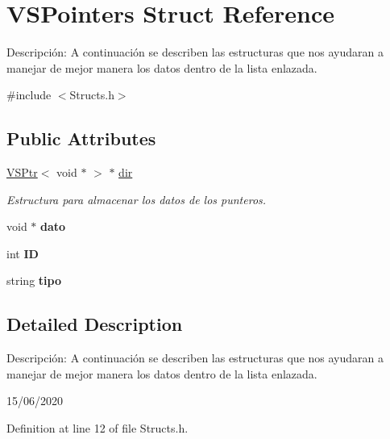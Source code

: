 \hypertarget{struct_v_s_pointers}{}\section{V\+S\+Pointers Struct Reference}
\label{struct_v_s_pointers}


Descripción\+: A continuación se describen las estructuras que nos ayudaran a manejar de mejor manera los datos dentro de la lista enlazada.  




{\ttfamily \#include $<$Structs.\+h$>$}

\subsection*{Public Attributes}
\begin{DoxyCompactItemize}
\item 
\hyperlink{class_v_s_ptr}{V\+S\+Ptr}$<$ void $\ast$ $>$ $\ast$ \hyperlink{struct_v_s_pointers_aea8397b023eff4e5652f02d17e4bd2b6}{dir}
\begin{DoxyCompactList}\small\item\em Estructura para almacenar los datos de los punteros. \end{DoxyCompactList}\item 
\mbox{\label{struct_v_s_pointers_ab7d83561dc6ec8c0d35cf006f675e97a}} 
void $\ast$ {\bfseries dato}
\item 
\mbox{\label{struct_v_s_pointers_a8a287582b1351c5f73d88a04c55d83eb}} 
int {\bfseries ID}
\item 
\mbox{\label{struct_v_s_pointers_a64e690de39959db50ad9347095f84dde}} 
string {\bfseries tipo}
\end{DoxyCompactItemize}


\subsection{Detailed Description}
Descripción\+: A continuación se describen las estructuras que nos ayudaran a manejar de mejor manera los datos dentro de la lista enlazada. 

15/06/2020 

Definition at line 12 of file Structs.\+h.



